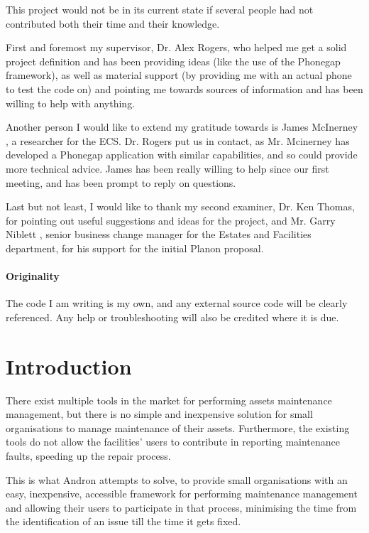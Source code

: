 \documentclass[12pt]{ecsproject}     %
\begin{document}
This project would not be in its current state if several people had not contributed both their time and their knowledge.

First and foremost my supervisor, Dr. Alex Rogers, who helped me get a solid project definition and has been providing ideas (like the use of the Phonegap framework), as well as material support (by providing me with an actual phone to test the code on) and pointing me towards sources of information and has been willing to help with anything.

Another person I would like to extend my gratitude towards is James McInerney , a researcher for the ECS. Dr. Rogers put us in contact, as Mr. Mcinerney has developed a Phonegap application with similar capabilities, and so could provide more technical advice. James has been really willing to help since our first meeting, and has been prompt to reply on questions.

Last but not least, I would like to thank my second examiner, Dr. Ken Thomas, for pointing out useful suggestions and ideas for the project, and Mr. Garry Niblett , senior business change manager for the Estates and Facilities department, for his support for the initial Planon proposal.


\paragraph{Originality} The code I am writing is my own, and any external source code will be clearly referenced. Any help or troubleshooting will also be credited where it is due.

\newpage
\section{Introduction}

There exist multiple tools in the market for performing assets maintenance management, but there is no simple and inexpensive solution for small organisations to manage maintenance of their assets. Furthermore, the existing tools do not allow the facilities' users to contribute in reporting maintenance faults, speeding up the repair process. 

This is what Andron attempts to solve, to provide small organisations with an easy, inexpensive, accessible framework for performing maintenance management and allowing their users to participate in that process, minimising the time from the identification of an issue till the time it gets fixed.
\end{document}
